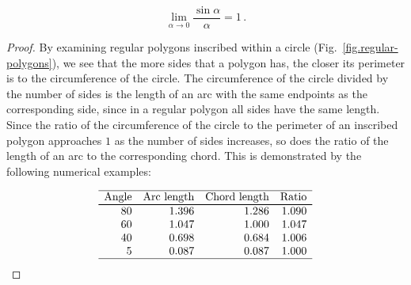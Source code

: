 \begin{theorem}\label{thm.limit-sine-over}
\[
\lim_{\alpha\rightarrow 0}\frac{\sin\alpha}{\alpha}=1\,.
\]
\end{theorem}

\begin{proof}
By examining  regular polygons inscribed within a circle (Fig.~\ref{fig.regular-polygons}), we see that the more sides that a polygon has, the closer its perimeter is to the circumference of the circle. The circumference of the circle divided by the number of sides is the length of an arc with the same endpoints as the corresponding side, since in a regular polygon all sides have the same length. Since the ratio of the circumference of the circle to the perimeter of an inscribed polygon approaches $1$ as the number of sides increases, so does the ratio of the length of an arc to the corresponding chord. This is demonstrated by the following numerical examples:

\enlargethispage{\baselineskip}
\vspace{-1ex}

\[
\begin{array}{r@{\hspace{10pt}}r@{\hspace{10pt}}r@{\hspace{10pt}}r}
\hline
\textrm{Angle} & \textrm{Arc length} & \textrm{Chord length} & \textrm{Ratio}\\\svhline
80 & 1.396 & 1.286  & 1.090\\
60 & 1.047 & 1.000  & 1.047\\
40 & 0.698 & 0.684 & 1.006\\
5  & 0.087 & 0.087 &1.000 \\\hline
\end{array}
\]


\end{proof}
